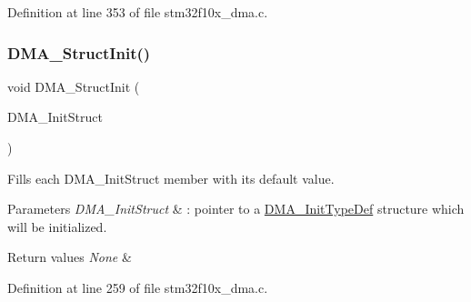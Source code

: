 Definition at line 353 of file stm32f10x\+\_\+dma.\+c.

\mbox{\label{group___d_m_a___exported___functions_ga0f7f95f750a90a6824f4e9b6f58adc7e}} 
\subsubsection{\texorpdfstring{D\+M\+A\+\_\+\+Struct\+Init()}{DMA\_StructInit()}}
{\footnotesize\ttfamily void D\+M\+A\+\_\+\+Struct\+Init (\begin{DoxyParamCaption}\item[{\hyperlink{struct_d_m_a___init_type_def}{D\+M\+A\+\_\+\+Init\+Type\+Def} $\ast$}]{D\+M\+A\+\_\+\+Init\+Struct }\end{DoxyParamCaption})}



Fills each D\+M\+A\+\_\+\+Init\+Struct member with its default value. 


\begin{DoxyParams}{Parameters}
{\em D\+M\+A\+\_\+\+Init\+Struct} & \+: pointer to a \hyperlink{struct_d_m_a___init_type_def}{D\+M\+A\+\_\+\+Init\+Type\+Def} structure which will be initialized. \\
\hline
\end{DoxyParams}

\begin{DoxyRetVals}{Return values}
{\em None} & \\
\hline
\end{DoxyRetVals}


Definition at line 259 of file stm32f10x\+\_\+dma.\+c.

